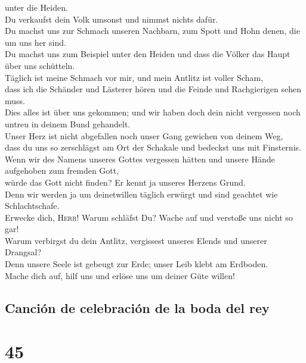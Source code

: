 unter die Heiden.\\
 Du verkaufst dein Volk umsonst und nimmst nichts
dafür.\\
 Du machst uns zur Schmach unseren Nachbarn, zum Spott
und Hohn denen, die um uns her sind.\\
 Du machst uns zum Beispiel unter den Heiden und dass die
Völker das Haupt über uns schütteln.\\
 Täglich ist meine Schmach vor mir, und mein Antlitz ist
voller Scham,\\
 dass ich die Schänder und Lästerer hören und die Feinde
und Rachgierigen sehen muss.\\
 Dies alles ist über uns gekommen; und wir haben doch
dein nicht vergessen noch untreu in deinem Bund gehandelt.\\
 Unser Herz ist nicht abgefallen noch unser Gang gewichen
von deinem Weg,\\
 dass du uns so zerschlägst am Ort der Schakale und
bedeckst uns mit Finsternis.\\
 Wenn wir des Namens unseres Gottes vergessen hätten und
unsere Hände aufgehoben zum fremden Gott,\\
 würde das Gott nicht finden? Er kennt ja unseres Herzens
Grund.\\
 Denn wir werden ja um deinetwillen täglich erwürgt und
sind geachtet wie Schlachtschafe.\\
 Erwecke dich, \textsc{Herr}! Warum schläfst Du? Wache
auf und verstoße uns nicht so gar!\\
 Warum verbirgst du dein Antlitz, vergissest unseres
Elends und unserer Drangsal?\\
 Denn unsere Seele ist gebeugt zur Erde; unser Leib klebt
am Erdboden.\\
 Mache dich auf, hilf uns und erlöse uns um deiner Güte
willen!

\hypertarget{canciuxf3n-de-celebraciuxf3n-de-la-boda-del-rey}{%
\subsection{Canción de celebración de la boda del
rey}\label{canciuxf3n-de-celebraciuxf3n-de-la-boda-del-rey}}

\hypertarget{section-44}{%
\section{45}\label{section-44}}

